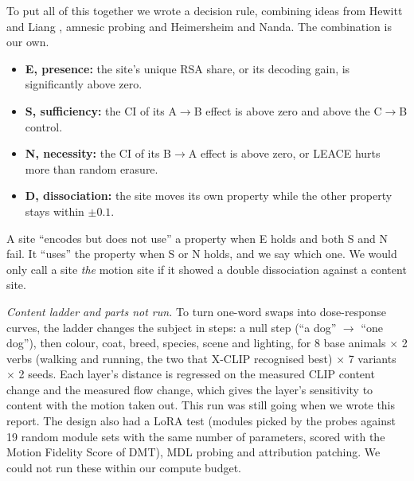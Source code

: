 \documentclass[twoside,english]{article}
\begin{document}
To put all of this together we wrote a decision rule, combining ideas from Hewitt and Liang
\citep{hewitt2019control}, amnesic probing and Heimersheim and Nanda. The combination is our own.
\begin{itemize}
\item \textbf{E, presence:} the site's unique RSA share, or its decoding gain, is significantly above zero.
\item \textbf{S, sufficiency:} the CI of its A$\to$B effect is above zero and above the C$\to$B control.
\item \textbf{N, necessity:} the CI of its B$\to$A effect is above zero, or LEACE hurts more than random
  erasure.
\item \textbf{D, dissociation:} the site moves its own property while the other property stays within
  $\pm 0.1$.
\end{itemize}
A site ``encodes but does not use'' a property when E holds and both S and N fail. It ``uses'' the
property when S or N holds, and we say which one. We would only call a site \emph{the} motion site if it
showed a double dissociation against a content site.

\emph{Content ladder and parts not run.} To turn one-word swaps into dose-response curves, the ladder
changes the subject in steps: a null step (``a dog'' $\to$ ``one dog''), then colour, coat, breed, species,
scene and lighting, for 8 base animals $\times$ 2 verbs (walking and running, the two that X-CLIP
recognised best) $\times$ 7 variants $\times$ 2 seeds. Each layer's distance is regressed on the measured
CLIP content change and the measured flow change, which gives the layer's sensitivity to content with
the motion taken out. This run was still going when we wrote this report. The design also had a LoRA
test (modules picked by the probes against 19 random module sets with the same number of parameters,
scored with the Motion Fidelity Score of DMT), MDL probing \citep{voita2020mdl} and attribution patching.
We could not run these within our compute budget.
\end{document}
